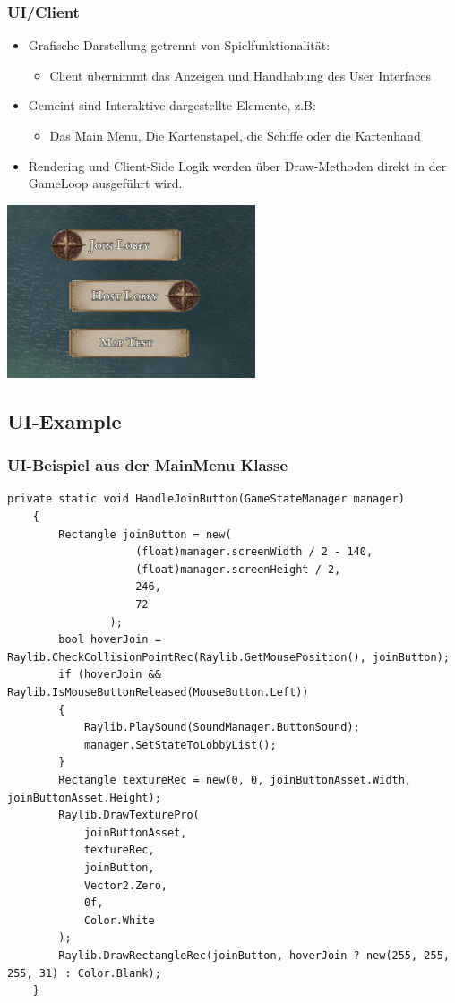 \documentclass{beamer}
\begin{document}
\begin{frame}
  \frametitle{UI/Client}
  \begin{itemize}
    \item Grafische Darstellung getrennt von Spielfunktionalität:
      \begin{itemize}
        \item Client übernimmt das Anzeigen und Handhabung des User Interfaces 
      \end{itemize}
    \item Gemeint sind Interaktive dargestellte Elemente, z.B:
    \begin{itemize} 
      \item Das Main Menu, Die Kartenstapel, die Schiffe oder die Kartenhand
    \end{itemize}
    \item Rendering und Client-Side Logik werden über Draw-Methoden direkt in der GameLoop ausgeführt wird.
  \end{itemize} 
  \centering
  \includegraphics[width=0.55\textwidth]{MainMenu.png}
\end{frame}

\subsection{UI-Example}
\begin{frame}[fragile]
  \frametitle{UI-Beispiel aus der MainMenu Klasse}
  \begin{lstlisting}[language=CSharp, basicstyle=\ttfamily\tiny, breaklines=true]
    private static void HandleJoinButton(GameStateManager manager)
    {
        Rectangle joinButton = new(
                    (float)manager.screenWidth / 2 - 140,
                    (float)manager.screenHeight / 2,
                    246,
                    72
                );
        bool hoverJoin = Raylib.CheckCollisionPointRec(Raylib.GetMousePosition(), joinButton);
        if (hoverJoin && Raylib.IsMouseButtonReleased(MouseButton.Left))
        {
            Raylib.PlaySound(SoundManager.ButtonSound);
            manager.SetStateToLobbyList();
        }
        Rectangle textureRec = new(0, 0, joinButtonAsset.Width, joinButtonAsset.Height);
        Raylib.DrawTexturePro(
            joinButtonAsset,
            textureRec,
            joinButton,
            Vector2.Zero,
            0f,
            Color.White
        );
        Raylib.DrawRectangleRec(joinButton, hoverJoin ? new(255, 255, 255, 31) : Color.Blank);
    }
  \end{lstlisting}
\end{frame}
\end{document}

